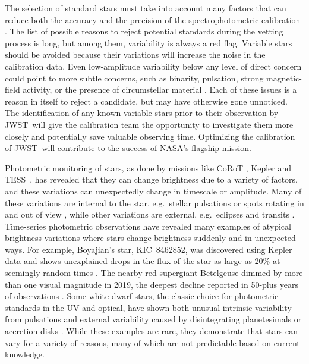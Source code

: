 \documentclass[twocolumn]{aastex631}
\newcommand{\webb}{JWST}
\newcommand{\tess}{TESS}
\begin{document}
The selection of standard stars must take into account many factors that can reduce both the accuracy and the precision of the spectrophotometric calibration \citep[e.g.][]{Sloan2015}.  The list of possible reasons to reject potential standards during the vetting process is long, but among them, variability is always a red flag.  Variable stars should be avoided because their variations will increase the noise in the calibration data.  Even low-amplitude variability below any level of direct concern could point to more subtle concerns, such as binarity, pulsation, strong magnetic-field activity, or the presence of circumstellar material \citep{Bohlin2014PASP126}. Each of these issues is a reason in itself to reject a candidate, but may have otherwise gone unnoticed.  The identification of any known variable stars prior to their observation by \webb\ will give the calibration team the opportunity to investigate them more closely and potentially save valuable observing time.  Optimizing the calibration of \webb\ will contribute to the success of NASA's flagship mission.

Photometric monitoring of stars, as done by missions like CoRoT \citep{corot}, Kepler \citep{Koch2010} and \tess\ \citep{Ricker2015}, has revealed that they can change brightness due to a variety of factors, and these variations can unexpectedly change in timescale or amplitude. Many of these variations are internal to the star, e.g.\ stellar pulsations or spots rotating in and out of view \citep[e.g.][]{Berger1979deltaScuti, Mcquillan2014}, while other variations are external, e.g.\ eclipses and transits \citep[e.g.][]{prsa2011, Thompson2018}. Time-series photometric observations have revealed many examples of atypical brightness variations where stars change brightness suddenly and in unexpected ways.  For example, Boyajian's star, KIC~8462852, was discovered using Kepler data and shows unexplained drops in the flux of the star as large as 20\% at seemingly random times \citep{Boyajian2016MNRAS}.  The nearby red supergiant Betelgeuse dimmed by more than one visual magnitude in 2019, the deepest decline reported in 50-plus years of observations \citep{Betelgeuse2021Natur594,Cotton2020RNAAS4}.  Some white dwarf stars, the classic choice for photometric standards in the UV and optical, have shown both unusual intrinsic variability from pulsations \citep[e.g.][]{Provencal2009ApJGD358,Kilic2015ApJ,Hermes2017MNRAS} and external variability caused by disintegrating planetesimals \citep[as large as 40\%][]{Vanderburg2015Natur,Guidry2021} or accretion disks \citep{Scaringi2021Nat}.  While these examples are rare, they demonstrate that stars can vary for a variety of reasons, many of which are not predictable based on current knowledge.  
\end{document}
